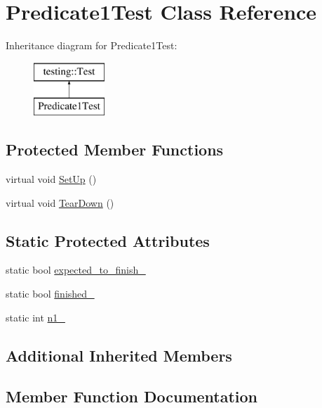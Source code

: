 \hypertarget{class_predicate1_test}{}\section{Predicate1\+Test Class Reference}
\label{class_predicate1_test}
Inheritance diagram for Predicate1\+Test\+:\begin{figure}[H]
\begin{center}
\leavevmode
\includegraphics[height=2.000000cm]{class_predicate1_test}
\end{center}
\end{figure}
\subsection*{Protected Member Functions}
\begin{DoxyCompactItemize}
\item 
virtual void \hyperlink{class_predicate1_test_a481704a09f73a37158513f9a336dbdd9}{Set\+Up} ()
\item 
virtual void \hyperlink{class_predicate1_test_ad2974af5c6abc508847c3a9912b24a90}{Tear\+Down} ()
\end{DoxyCompactItemize}
\subsection*{Static Protected Attributes}
\begin{DoxyCompactItemize}
\item 
static bool \hyperlink{class_predicate1_test_ad91cfa58e6352d53abacce32df2ef635}{expected\+\_\+to\+\_\+finish\+\_\+}
\item 
static bool \hyperlink{class_predicate1_test_a6d45fb2d1f01a5c8baf28f60039c244e}{finished\+\_\+}
\item 
static int \hyperlink{class_predicate1_test_a528d9f7f618b17802962a3824eea11e3}{n1\+\_\+}
\end{DoxyCompactItemize}
\subsection*{Additional Inherited Members}


\subsection{Member Function Documentation}
\hypertarget{class_predicate1_test_a481704a09f73a37158513f9a336dbdd9}{}

